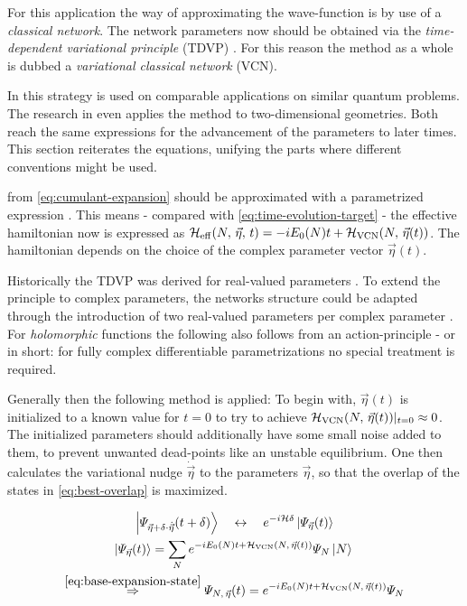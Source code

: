For this application the way of approximating the wave-function is by use of a \emph{classical network}. 
The network parameters now should be obtained via the \emph{time-dependent variational principle} (TDVP) \cite{originalDerivationTimeDependendVariationalPrinciple}.
For this reason the method as a whole is dubbed a \emph{variational classical network} (VCN).

In \cite{variationalClassicalNetworksPaper} this strategy is used on comparable applications on similar quantum problems.
The research in \cite{probabilitySamplingRequirementVCN} even applies the method to two-dimensional geometries.
Both reach the same expressions for the advancement of the parameters to later times.
This section reiterates the equations, unifying the parts where different conventions might be used.

\HNOft from \autoref{eq:cumulant-expansion} should be approximated with a parametrized expression .
This means - compared with \autoref{eq:time-evolution-target} - the effective hamiltonian now is expressed as $\HeffOft[N,\,\vec{\eta}] = -i E_0(N) t + \Hvcn{\vec{\eta}(t)}$.
The hamiltonian depends on the choice of the complex parameter vector $\vec{\eta}(t)$.

Historically the TDVP was derived for real-valued parameters \cite{originalDerivationTimeDependendVariationalPrinciple}.
To extend the principle to complex parameters, the networks structure could be adapted through the introduction of two real-valued parameters per complex parameter \cite{TDVPcomplexPrefactors}.
For \emph{holomorphic} functions the following also follows from an action-principle \cite{probabilitySamplingRequirementVCN} - or in short: for fully complex differentiable \cite{complexDifferentiation} parametrizations no special treatment is required.

Generally then the following method is applied: To begin with, $\vec{\eta}(t)$ is initialized to a known value for $t=0$ to try to achieve $\Hvcn{\vec{\eta}(t)} \vert_{t=0} \approx 0$.
The initialized parameters should additionally have some small noise added to them, to prevent unwanted dead-points like an unstable equilibrium.
One then calculates the variational nudge $\dot{\vec{\eta}}$ to the parameters $\vec{\eta}$, so that the overlap of the states in \autoref{eq:best-overlap} is maximized.

\begin{equation}
    \label{eq:best-overlap}
    \begin{gathered}
        \ketpsiEta{\vec{\eta} + \delta \cdot \dot{\vec{\eta}}}{t + \delta} \quad\leftrightarrow\quad e^{-i \hamiltonian \delta} \ketpsiEta{\vec{\eta}}{t}
        \\
        \ketpsiEta{\vec{\eta}}{t} = \lsum[N] e^{-i E_0(N) t + \Hvcn{\vec{\eta}(t)}} \psiN \ketN{}
        \\
        \stackrel{\ref{eq:base-expansion-state}}{\Rightarrow} \psiEta{N,\,\vec{\eta}}{t} = e^{-i E_0(N) t + \Hvcn{\vec{\eta}(t)}} \psiN
    \end{gathered}
\end{equation}


